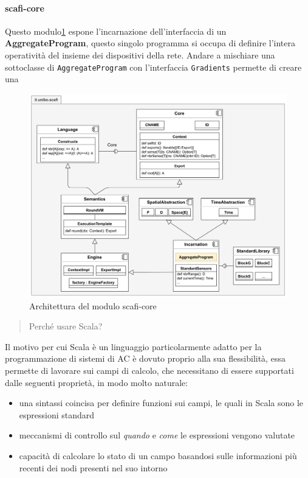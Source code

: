 \documentclass[12pt,a4paper,openright,twoside]{book}
\begin{document}
\paragraph{scafi-core} Questo modulo\cref{fig:core-arc} espone l'incarnazione dell'interfaccia di un \textbf{AggregateProgram}, questo singolo programma si occupa di definire l'intera operatività del insieme dei dispositivi della rete. Andare a mischiare una sottoclasse di \verb|AggregateProgram| con l'interfaccia \verb|Gradients| permette di creare una 

\begin{figure}
    \centering
    \includegraphics[width=.9\linewidth]{figures/core-arc.png}
    \caption{Architettura del modulo scafi-core}
    \label{fig:core-arc}
\end{figure}

\begin{quote}
    \centering
    Perché usare Scala?
\end{quote}

Il motivo per cui Scala è un linguaggio particolarmente adatto per la programmazione di sistemi di \ac{AC} è dovuto proprio alla sua flessibilità, essa permette di lavorare sui campi di calcolo, che necessitano di essere supportati dalle seguenti proprietà, in modo molto naturale:

\begin{itemize}
    \item una sintassi coincisa per definire funzioni sui campi, le quali in Scala sono le espressioni standard
    \item meccanismi di controllo sul \textit{quando} e \textit{come} le espressioni vengono valutate
    \item capacità di calcolare lo stato di un campo basandosi sulle informazioni più recenti dei nodi presenti nel suo intorno
\end{itemize}
\end{document}
